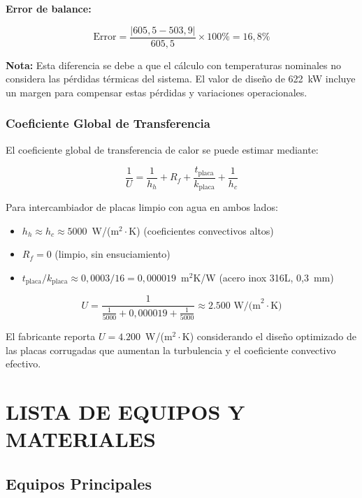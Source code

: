 \documentclass[12pt,a4paper]{article}
\begin{document}
\textbf{Error de balance:}

\begin{equation}
\text{Error} = \frac{|605{,}5 - 503{,}9|}{605{,}5} \times 100\% = 16{,}8\%
\end{equation}

\textbf{Nota:} Esta diferencia se debe a que el cálculo con temperaturas nominales no considera las pérdidas térmicas del sistema. El valor de diseño de 622~kW incluye un margen para compensar estas pérdidas y variaciones operacionales.

\subsubsection{Coeficiente Global de Transferencia}

El coeficiente global de transferencia de calor se puede estimar mediante:

\begin{equation}
\frac{1}{U} = \frac{1}{h_h} + R_f + \frac{t_{\text{placa}}}{k_{\text{placa}}} + \frac{1}{h_c}
\end{equation}

Para intercambiador de placas limpio con agua en ambos lados:
\begin{itemize}
    \item $h_h \approx h_c \approx 5000$~W/(m$^2\cdot$K) (coeficientes convectivos altos)
    \item $R_f = 0$ (limpio, sin ensuciamiento)
    \item $t_{\text{placa}}/k_{\text{placa}} \approx 0{,}0003/16 = 0{,}000019$~m$^2$K/W (acero inox 316L, 0,3~mm)
\end{itemize}

\begin{equation}
U = \frac{1}{\frac{1}{5000} + 0{,}000019 + \frac{1}{5000}} \approx 2.500 \text{ W/(m}^2\cdot\text{K)}
\end{equation}

El fabricante reporta $U = 4.200$~W/(m$^2\cdot$K) considerando el diseño optimizado de las placas corrugadas que aumentan la turbulencia y el coeficiente convectivo efectivo.

\newpage

\section{LISTA DE EQUIPOS Y MATERIALES}

\subsection{Equipos Principales}
\end{document}
